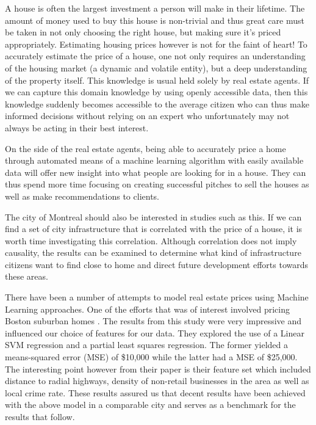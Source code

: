 \documentclass{acm_proc_article-sp}
\begin{document}
	A house is often the largest investment a person will make in their lifetime. The amount of money used to buy this house is non-trivial and thus great care must be taken in not only choosing the right house, but making sure it's priced appropriately. Estimating housing prices however is not for the faint of heart! To accurately estimate the price of a house, one not only requires an understanding of the housing market (a dynamic and volatile entity), but a deep understanding of the property itself. This knowledge is usual held solely by real estate agents. If we can capture this domain knowledge by using openly accessible data, then this knowledge suddenly becomes accessible to the average citizen who can thus make informed decisions without relying on an expert who unfortunately may not always be acting in their best interest.
	
	On the side of the real estate agents, being able to accurately price a home through automated means of a machine learning algorithm with easily available data will offer new insight into what people are looking for in a house. They can thus spend more time focusing on creating successful pitches to sell the houses as well as make recommendations to clients.
	
	The city of Montreal should also be interested in studies such as this. If we can find a set of city infrastructure that is correlated with the price of a house, it is worth time investigating this correlation. Although correlation does not imply causality, the results can be examined to determine what kind of infrastructure citizens want to find close to home and direct future development efforts towards these areas.
	
	There have been a number of attempts to model real estate prices using Machine Learning approaches. One of the efforts that was of interest involved pricing Boston suburban homes \cite{bostonres}. The results from this study were very impressive and influenced our choice of features for our data. They explored the use of a Linear SVM regression and a partial least squares regression. The former yielded a means-squared error (MSE) of \$10,000 while the latter had a MSE of \$25,000. The interesting point however from their paper is their feature set which included distance to radial highways, density of non-retail businesses in the area as well as local crime rate. These results assured us that decent results have been achieved with the above model in a comparable city and serves as a benchmark for the results that follow. 
	
\end{document}
